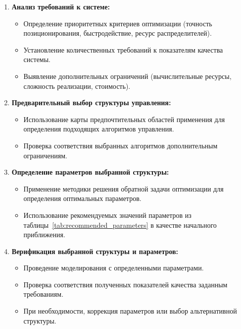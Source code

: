 \begin{enumerate}
	\item \textbf{Анализ требований к системе:}
	      \begin{itemize}
		      \item Определение приоритетных критериев оптимизации (точность позиционирования,
		            быстродействие, ресурс распределителей).
		      \item Установление количественных требований к показателям качества системы.
		      \item Выявление дополнительных ограничений (вычислительные ресурсы, сложность реализации, стоимость).
	      \end{itemize}

	\item \textbf{Предварительный выбор структуры управления:}
	      \begin{itemize}
		      \item Использование карты предпочтительных областей применения для определения
		            подходящих алгоритмов управления.
		      \item Проверка соответствия выбранных алгоритмов дополнительным ограничениям.
	      \end{itemize}

	\item \textbf{Определение параметров выбранной структуры:}
	      \begin{itemize}
		      \item Применение методики решения обратной задачи оптимизации для определения
		            оптимальных параметров.
		      \item Использование рекомендуемых значений параметров из таблицы~\ref{tab:recommended_parameters}
		            в качестве начального приближения.
	      \end{itemize}

	\item \textbf{Верификация выбранной структуры и параметров:}
	      \begin{itemize}
		      \item Проведение моделирования с определенными параметрами.
		      \item Проверка соответствия полученных показателей качества заданным требованиям.
		      \item При необходимости, коррекция параметров или выбор альтернативной структуры.
	      \end{itemize}
\end{enumerate}

